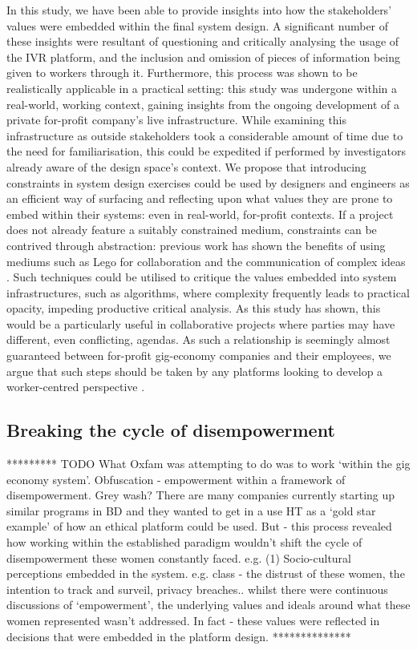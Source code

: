 In this study, we have been able to provide insights into how the stakeholders' values were embedded within the final system design. A significant number of these insights were resultant of questioning and critically analysing the usage of the IVR platform, and the inclusion and omission of pieces of information being given to workers through it. Furthermore, this process was shown to be realistically applicable in a practical setting: this study was undergone within a real-world, working context, gaining insights from the ongoing development of a private for-profit company's live infrastructure. While examining this infrastructure as outside stakeholders took a considerable amount of time due to the need for familiarisation, this could be expedited if performed by investigators already aware of the design space's context. We propose that introducing constraints in system design exercises could be used by designers and engineers as an efficient way of surfacing and reflecting upon what values they are prone to embed within their systems: even in real-world, for-profit contexts. If a project does not already feature a suitably constrained medium, constraints can be contrived through abstraction: previous work has shown the benefits of using mediums such as Lego for collaboration and the communication of complex ideas \cite{Cantoni2009}. Such techniques could be utilised to critique the values embedded into system infrastructures, such as algorithms, where complexity frequently leads to practical opacity, impeding productive critical analysis. As this study has shown, this would be a particularly useful in collaborative projects where parties may have different, even conflicting, agendas. As such a relationship is seemingly almost guaranteed between for-profit gig-economy companies and their employees, we argue that such steps should be taken by any platforms looking to develop a worker-centred perspective \citep{carlos2021}.

\subsection{Breaking the cycle of disempowerment}

********* TODO What Oxfam was attempting to do was to work ‘within the gig economy system’.  Obfuscation - empowerment within a framework of disempowerment. Grey wash? There are many companies currently starting up similar programs in BD and they wanted to get in a use HT as a ‘gold star example’ of how an ethical platform could be used. But - this process revealed how working within the established paradigm wouldn’t shift the cycle of disempowerment these women constantly faced. e.g. (1) Socio-cultural perceptions embedded in the system. e.g. class - the distrust of these women, the intention to track and surveil, privacy breaches.. whilst there were continuous discussions of ‘empowerment’, the underlying values and ideals around what these women represented wasn’t addressed. In fact - these values were reflected in decisions that were embedded in the platform design. **************

